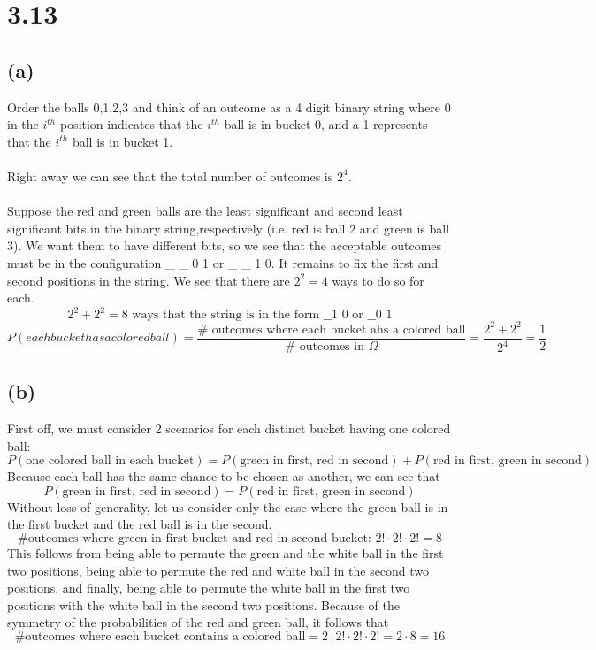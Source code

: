 \documentclass[11pt]{article}
\begin{document}
\section*{3.13}
\subsection*{(a)}
Order the balls 0,1,2,3 and think of an outcome as a 4 digit binary string where 0 in the $i^{th}$ position indicates that the $i^{th}$ ball is in bucket 0, and a 1 represents that the $i^{th}$ ball is in bucket 1. \\ \\
Right away we can see that the total number of outcomes is $2^4$. \\ \\
Suppose the red and green balls are the least significant and second least significant bits in the binary string,respectively (i.e. red is ball 2 and green is ball 3). We want them to have different bits, so we see that the acceptable outcomes must be in the configuration \_ \_ 0 1 or \_ \_ 1 0. It remains to fix the first and second positions in the string. We see that there are $2^2=4$ ways to do so for each.
\[2^2+2^2=8\text{ ways that the string is in the form \_ \_ 1 0 or \_ \_ 0 1}\]
\[P(each bucket has a colored ball)=\frac{\#\text{ outcomes where each bucket ahs a colored ball}}{\#\text{ outcomes in }\Omega}=\frac{2^2+2^2}{2^4}=\frac{1}{2}\]
\subsection*{(b)}
First off, we must consider 2 scenarios for each distinct bucket having one colored ball:
\[P(\text{one colored ball in each bucket})=P(\text{green in first, red in second})+P(\text{red in first, green in second})\]
Because each ball has the same chance to be chosen as another, we can see that
\[P(\text{green in first, red in second})=P(\text{red in first, green in second})\]
Without loss of generality, let us consider only the case where the green ball is in the first bucket and the red ball is in the second.
\[\text{\# outcomes where green in first bucket and red in second bucket: }2!\cdot2!\cdot2!=8\]
This follows from being able to permute the green and the white ball in the first two positions, being able to permute the red and white ball in the second two positions, and finally, being able to permute the white ball in the first two positions with the white ball in the second two positions. Because of the symmetry of the probabilities of the red and green ball, it follows that
\[\text{\# outcomes where each bucket contains a colored ball}=2\cdot 2!\cdot 2!\cdot 2!=2\cdot 8=16\]
\end{document}
